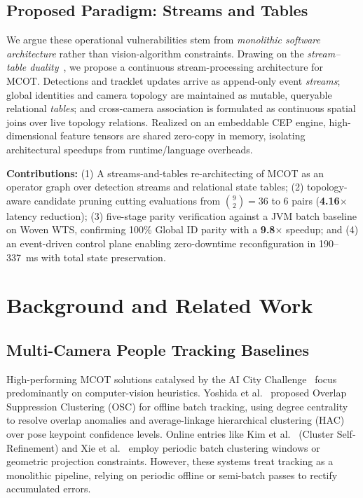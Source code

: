 \documentclass[conference]{IEEEtran}
\begin{document}
\vspace{-0.5em}
\subsection{Proposed Paradigm: Streams and Tables}
We argue these operational vulnerabilities stem from \emph{monolithic software architecture} rather than vision-algorithm constraints. Drawing on the \emph{stream--table duality}~\cite{sax2018streams}, we propose a continuous stream-processing architecture for MCOT. Detections and tracklet updates arrive as append-only event \emph{streams}; global identities and camera topology are maintained as mutable, queryable relational \emph{tables}; and cross-camera association is formulated as continuous spatial joins over live topology relations. Realized on an embeddable CEP engine, high-dimensional feature tensors are shared zero-copy in memory, isolating architectural speedups from runtime/language overheads.

\textbf{Contributions:} (1) A streams-and-tables re-architecting of MCOT as an operator graph over detection streams and relational state tables; (2) topology-aware candidate pruning cutting evaluations from $\binom{9}{2}=36$ to $6$ pairs (\textbf{4.16$\times$} latency reduction); (3) five-stage parity verification against a JVM batch baseline on Woven WTS, confirming 100\% Global ID parity with a \textbf{9.8$\times$} speedup; and (4) an event-driven control plane enabling zero-downtime reconfiguration in 190--337~ms with total state preservation.

\section{Background and Related Work}
\label{sec:background}

\subsection{Multi-Camera People Tracking Baselines}
High-performing MCOT solutions catalysed by the AI City Challenge~\cite{yoshida2024overlap,kim2024cluster,xie2024robust,specker2024ocmctrack} focus predominantly on computer-vision heuristics. Yoshida et al.~\cite{yoshida2024overlap} proposed Overlap Suppression Clustering (OSC) for offline batch tracking, using degree centrality to resolve overlap anomalies and average-linkage hierarchical clustering (HAC) over pose keypoint confidence levels. Online entries like Kim et al.~\cite{kim2024cluster} (Cluster Self-Refinement) and Xie et al.~\cite{xie2024robust} employ periodic batch clustering windows or geometric projection constraints. However, these systems treat tracking as a monolithic pipeline, relying on periodic offline or semi-batch passes to rectify accumulated errors.
\end{document}
